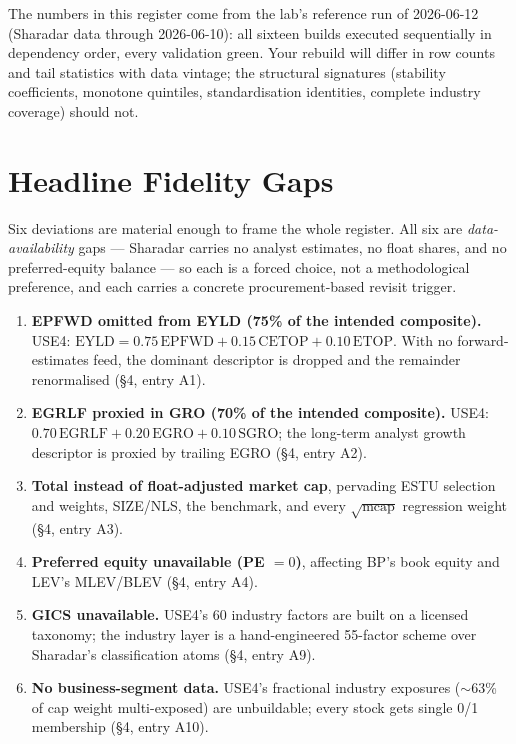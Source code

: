 \documentclass[11pt,a4paper]{article}
\begin{document}
The numbers in this register come from the lab's reference run of 2026-06-12
(Sharadar data through 2026-06-10): all sixteen builds executed sequentially
in dependency order, every validation green. Your rebuild will differ in row counts
and tail statistics with data vintage; the structural signatures (stability
coefficients, monotone quintiles, standardisation identities, complete industry
coverage) should not.

\section{Headline Fidelity Gaps}

Six deviations are material enough to frame the whole register. All six are
\emph{data-availability} gaps --- Sharadar carries no analyst estimates, no
float shares, and no preferred-equity balance --- so each is a forced choice,
not a methodological preference, and each carries a concrete procurement-based
revisit trigger.

\begin{enumerate}[leftmargin=*,topsep=2pt,itemsep=4pt]
  \item \textbf{EPFWD omitted from EYLD (75\% of the intended composite).}
    USE4: $\mathrm{EYLD} = 0.75\,\mathrm{EPFWD} + 0.15\,\mathrm{CETOP} +
    0.10\,\mathrm{ETOP}$. With no forward-estimates feed, the dominant
    descriptor is dropped and the remainder renormalised (\S4, entry A1).
  \item \textbf{EGRLF proxied in GRO (70\% of the intended composite).}
    USE4: $0.70\,\mathrm{EGRLF} + 0.20\,\mathrm{EGRO} + 0.10\,\mathrm{SGRO}$;
    the long-term analyst growth descriptor is proxied by trailing EGRO
    (\S4, entry A2).
  \item \textbf{Total instead of float-adjusted market cap}, pervading ESTU
    selection and weights, SIZE/NLS, the benchmark, and every
    $\sqrt{\text{mcap}}$ regression weight (\S4, entry A3).
  \item \textbf{Preferred equity unavailable (PE $=0$)}, affecting BP's book
    equity and LEV's MLEV/BLEV (\S4, entry A4).
  \item \textbf{GICS unavailable.} USE4's 60 industry factors are built on a
    licensed taxonomy; the industry layer is a hand-engineered 55-factor scheme
    over Sharadar's classification atoms (\S4, entry A9).
  \item \textbf{No business-segment data.} USE4's fractional industry exposures
    ($\sim$63\% of cap weight multi-exposed) are unbuildable; every stock gets
    single 0/1 membership (\S4, entry A10).
\end{enumerate}
\end{document}
